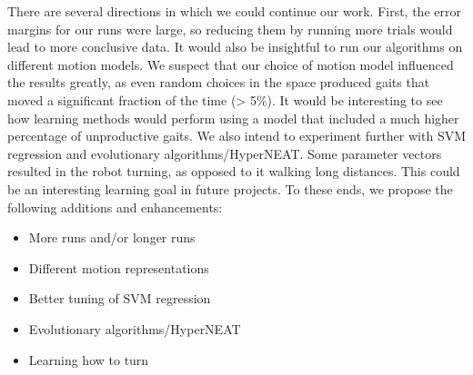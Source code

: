 



There are several directions in which we could continue our
work. First, the error margins for our runs were large, so reducing
them by running more trials would lead to more conclusive data. It
would also be insightful to run our algorithms on different motion
models.  We suspect that our choice of motion model influenced the
results greatly, as even random choices in the space produced gaits
that moved a significant fraction of the time (> 5\%).  It would be
interesting to see how learning methods would perform using a model
that included a much higher percentage of unproductive gaits. We also
intend to experiment further with SVM regression and evolutionary
algorithms/HyperNEAT.  Some parameter vectors resulted in the robot
turning, as opposed to it walking long distances. This could be an
interesting learning goal in future projects. To these ends, we
propose the following additions and enhancements:

\begin{itemize}
\item More runs and/or longer runs
\item Different motion representations
\item Better tuning of SVM regression
\item Evolutionary algorithms/HyperNEAT
\item Learning how to turn
\end{itemize}
